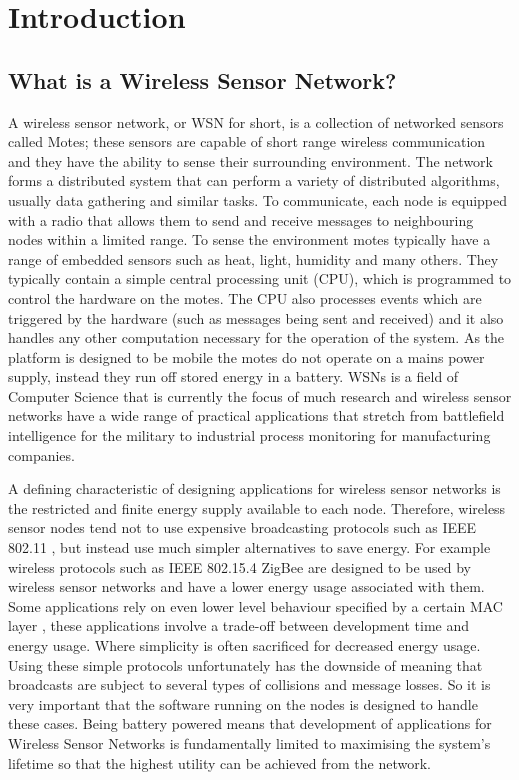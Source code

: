 \section{Introduction}

\subsection{What is a Wireless Sensor Network?}

A wireless sensor network, or WSN for short, is a collection of networked sensors called Motes; these sensors are capable of short range wireless communication and they have the ability to sense their surrounding environment\cite{Mica2002,TankBible}. The network forms a distributed system that can perform a variety of distributed algorithms, usually data gathering and similar tasks. To communicate, each node is equipped with a radio that allows them to send and receive messages to neighbouring nodes within a limited range. To sense the environment motes typically have a range of embedded sensors such as heat, light, humidity and many others. They typically contain a simple central processing unit (CPU), which is programmed to control the hardware on the motes. The CPU also processes events which are triggered by the hardware (such as messages being sent and received) and it also handles any other computation necessary for the operation of the system. As the platform is designed to be mobile the motes do not operate on a mains power supply, instead they run off stored energy in a battery. WSNs is a field of Computer Science that is currently the focus of much research and wireless sensor networks have a wide range of practical applications that stretch from battlefield intelligence for the military\cite{Akyildiz2002393,1368897,1457970} to industrial process monitoring for manufacturing companies\cite{?}.

A defining characteristic of designing applications for wireless sensor networks is the restricted and finite energy supply available to each node. Therefore, wireless sensor nodes tend not to use expensive broadcasting protocols such as IEEE 802.11 \cite{Mica2002}, but instead use much simpler alternatives to save energy. For example wireless protocols such as IEEE 802.15.4 ZigBee \cite{1253873, 4014617} are designed to be used by wireless sensor networks and have a lower energy usage associated with them. Some applications rely on even lower level behaviour specified by a certain MAC layer \cite{5751321,4469515,Polastre:2004:VLP:1031495.1031508,1019408,Buettner:2006:XSP:1182807.1182838}, these applications involve a trade-off between development time and energy usage. Where simplicity is often sacrificed for decreased energy usage. Using these simple protocols unfortunately has the downside of meaning that broadcasts are subject to several types of collisions and message losses. So it is very important that the software running on the nodes is designed to handle these cases. Being battery powered means that development of applications for Wireless Sensor Networks is fundamentally limited to maximising the system's lifetime so that the highest utility can be achieved from the network.


